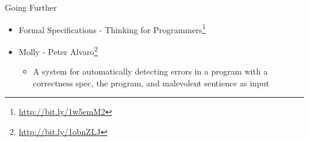 \documentclass[presentation, bigger]{beamer}
\begin{document}
\begin{frame}[label=sec-]{Going Further}
\begin{itemize}
\item Formal Specifications - Thinking for Programmers\footnote{\url{http://bit.ly/1w5emM2}}
\item Molly - Peter Alvaro\footnote{\url{http://bit.ly/1obnZLJ}}
\begin{itemize}
\item A system for automatically detecting errors in a
program with a correctness spec, the program, and
malevolent sentience as input
\end{itemize}
\end{itemize}
\end{frame}
\end{document}
